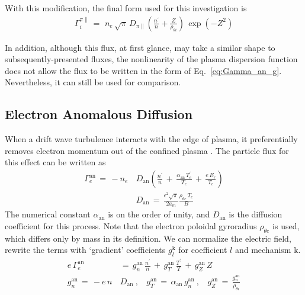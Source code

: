With this modification, the final form used for this investigation is
\begin{align} %
	\Gamma_i^{\pi\parallel} \,=\, \,n_e \, \sqrt{\pi} \, D_{\pi\parallel}
		\left(\frac{n^\prime}{n} + \frac{Z}{\rho_{\theta i}}\right) \,
		\exp\left(-Z^2\right) \label{eq:Gamma_bulk_final}
\end{align}

In addition, although this flux, at first glance, may take a similar shape to subsequently-presented fluxes, the nonlinearity of the plasma dispersion function does not allow the flux to be written in the form of Eq.~\ref{eq:Gamma_an_g}.
Nevertheless, it can still be used for comparison.


\subsection{Electron Anomalous Diffusion}\label{ssec:an_diffusion}
When a drift wave turbulence interacts with the edge of plasma, it preferentially removes electron momentum out of the confined plasma \cite{itoh_model_1988} \cite{stringer_non-ambipolar_1995}.
The particle flux for this effect can be written as
\begin{align} %
	\Gamma_e^\text{an} \,=\, -n_e \, &D_\text{an} \left(\frac{n^\prime}{n} \,+\,
		\frac{\alpha_\text{an}\,T_e^\prime}{T_e} \,+\, \frac{e\,E_r}{T_e}\right)
		\label{eq:Gamma_an_orig} \\
	&D_\text{an} \,=\, \frac{\epsilon^2 \sqrt{\pi}}{2 a_m}
		\frac{\rho_{\theta e} \, T_e}{B} \label{eq:D_an}
\end{align}
The numerical constant $\alpha_\text{an}$ is on the order of unity, and $D_\text{an}$ is the diffusion coefficient for this process.
Note that the electron poloidal gyroradius $\rho_{\theta e}$ is used, which differs only by mass in its definition.
We can normalize the electric field, rewrite the terms with `gradient' coefficients $g_l^\text{k}$ for coefficient $l$ and mechanism $\text{k}$.
\begin{align} %
	e\,\Gamma_e^\text{an} \,&=\, g_n^\text{an}\,\frac{n^\prime}{n} \,+\,
		g_T^\text{an}\,\frac{T^\prime}{T} \,+\,
		g_Z^\text{an}\,Z \label{eq:Gamma_an_g} \\
	g_n^\text{an} \,=\, -e \, n \, &D_\text{an}~,~~~~
		g_T^\text{an} \,=\, \alpha_\text{an} \, g_n^\text{an}~,~~~~
		g_Z^\text{an} \,=\, \frac{g_n^\text{an}}{\rho_{\theta i}}
		\label{eq:g_an}
\end{align}



